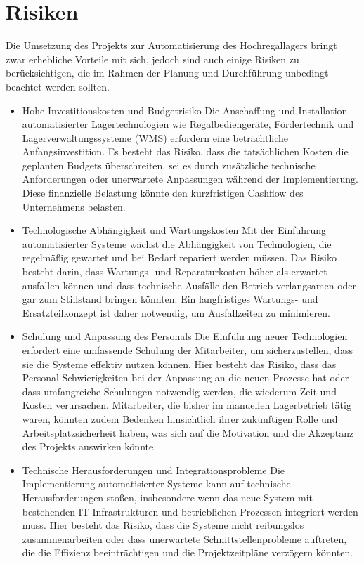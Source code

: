 \chapter{Risiken}
\label{cha:Einleitung}

Die Umsetzung des Projekts zur Automatisierung des Hochregallagers bringt zwar erhebliche Vorteile mit sich, jedoch sind auch einige Risiken zu berücksichtigen, die im Rahmen der Planung und Durchführung unbedingt beachtet werden sollten.

\begin{itemize}
	\item Hohe Investitionskosten und Budgetrisiko
	Die Anschaffung und Installation automatisierter Lagertechnologien wie Regalbediengeräte, Fördertechnik und Lagerverwaltungssysteme (WMS) erfordern eine beträchtliche Anfangsinvestition. Es besteht das Risiko, dass die tatsächlichen Kosten die geplanten Budgets überschreiten, sei es durch zusätzliche technische Anforderungen oder unerwartete Anpassungen während der Implementierung. Diese finanzielle Belastung könnte den kurzfristigen Cashflow des Unternehmens belasten.
	\item Technologische Abhängigkeit und Wartungskosten
	Mit der Einführung automatisierter Systeme wächst die Abhängigkeit von Technologien, die regelmäßig gewartet und bei Bedarf repariert werden müssen. Das Risiko besteht darin, dass Wartungs- und Reparaturkosten höher als erwartet ausfallen können und dass technische Ausfälle den Betrieb verlangsamen oder gar zum Stillstand bringen könnten. Ein langfristiges Wartungs- und Ersatzteilkonzept ist daher notwendig, um Ausfallzeiten zu minimieren.
	\item Schulung und Anpassung des Personals
	 Die Einführung neuer Technologien erfordert eine umfassende Schulung der Mitarbeiter, um sicherzustellen, dass sie die Systeme effektiv nutzen können. Hier besteht das Risiko, dass das Personal Schwierigkeiten bei der Anpassung an die neuen Prozesse hat oder dass umfangreiche Schulungen notwendig werden, die wiederum Zeit und Kosten verursachen. Mitarbeiter, die bisher im manuellen Lagerbetrieb tätig waren, könnten zudem Bedenken hinsichtlich ihrer zukünftigen Rolle und Arbeitsplatzsicherheit haben, was sich auf die Motivation und die Akzeptanz des Projekts auswirken könnte.
	\item Technische Herausforderungen und Integrationsprobleme
	Die Implementierung automatisierter Systeme kann auf technische Herausforderungen stoßen, insbesondere wenn das neue System mit bestehenden IT-Infrastrukturen und betrieblichen Prozessen integriert werden muss. Hier besteht das Risiko, dass die Systeme nicht reibungslos zusammenarbeiten oder dass unerwartete Schnittstellenprobleme auftreten, die die Effizienz beeinträchtigen und die Projektzeitpläne verzögern könnten.

\end{itemize}
